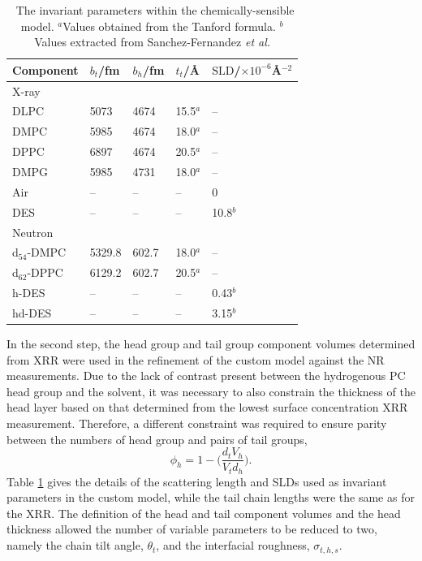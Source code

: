 \documentclass[twoside,twocolumn,9pt]{article}
\begin{document}
\begin{table}[h]
	\small
	\caption{\ The invariant parameters within the chemically-sensible model. 
	$^a$Values obtained from the Tanford formula.\cite{Tanford1980} $^b$Values extracted from Sanchez-Fernandez \emph{et al.}\cite{Sanchez-Fernandez2016}}
	\label{tab:invariant}
	\begin{tabular*}{0.48\textwidth}{@{\extracolsep{\fill}}lllll}
		\hline
		Component & $b_t$/fm & $b_h$/fm & $t_t$/\AA & $\text{SLD}$/$\times10^{-6}$\AA$^{-2}$ \\
		\hline
		X-ray & & & & \\
		DLPC & 5073 & 4674 & 15.5$^a$ & -- \\
		DMPC & 5985 & 4674 & 18.0$^a$ & -- \\
		DPPC & 6897 & 4674 & 20.5$^a$ & -- \\
		DMPG & 5985 & 4731 & 18.0$^a$ & --\\
		Air & -- & -- & -- & 0\\
		DES & -- & -- & -- & 10.8$^b$ \\
		\hline
		Neutron & & & & \\
		d$_{54}$-DMPC & 5329.8 & 602.7 & 18.0$^a$ & -- \\
		d$_{62}$-DPPC & 6129.2 & 602.7 & 20.5$^a$ & -- \\
		h-DES & -- & -- & -- & 0.43$^b$  \\
		hd-DES & -- & -- & -- & 3.15$^b$ \\
		\hline
	\end{tabular*}
\end{table}

In the second step, the head group and tail group component volumes determined from XRR were used in the refinement of the custom model against the NR measurements. Due to the lack of contrast present between the hydrogenous PC head group and the solvent, it was necessary to also constrain the thickness of the head layer based on that determined from the lowest surface concentration XRR measurement. Therefore, a different constraint was required to ensure parity between the numbers of head group and pairs of tail groups,
\begin{equation}
\label{equ:phih}
\phi_h =  1 - \bigg(\frac{d_tV_h}{V_td_h}\bigg).
\end{equation}
Table \ref{tab:invariant} gives the details of the scattering length and SLDs used as invariant parameters in the custom model, while the tail chain lengths were the same as for the XRR. The definition of the head and tail component volumes and the head thickness allowed the number of variable parameters to be reduced to two, namely the chain tilt angle, $\theta_t$, and the interfacial roughness, $\sigma_{t,h,s}$. 
\end{document}
